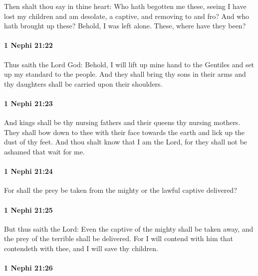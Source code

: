 			Then shalt thou say in thine heart:
			Who hath begotten me these,
			seeing I have lost my children
			and am desolate, a captive,
			and removing to and fro?
			And who hath brought up these?
			Behold, I was left alone.
			These, where have they been?

		\paragraph{1 Nephi 21:22} %
			\label{1NEPHI-21-22}

			Thus saith the Lord God:
			Behold, I will lift up mine hand to the Gentiles
			and set up my standard to the people.
			And they shall bring thy sons in their arms
			and thy daughters shall be carried upon their shoulders.

		\paragraph{1 Nephi 21:23} %
			\label{1NEPHI-21-23}

			And kings shall be thy nursing fathers
			and their queens thy nursing mothers.
			They shall bow down to thee with their face towards the earth
			and lick up the dust of thy feet.
			And thou shalt know that I am the Lord,
			for they shall not be ashamed that wait for me.

		\paragraph{1 Nephi 21:24} %
			\label{1NEPHI-21-24}

			For shall the prey be taken from the mighty
			or the lawful captive delivered?

		\paragraph{1 Nephi 21:25} %
			\label{1NEPHI-21-25}

			But thus saith the Lord:
			Even the captive of the mighty shall be taken away,
			and the prey of the terrible shall be delivered.
			For I will contend with him that contendeth with thee,
			and I will save thy children.

		\paragraph{1 Nephi 21:26} %
			\label{1NEPHI-21-26}

